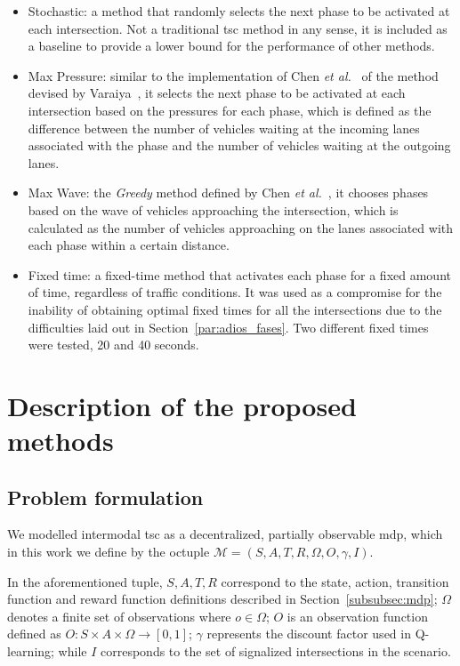 \begin{itemize}
    \item Stochastic: a method that randomly selects the next phase to be activated at each intersection. Not a traditional \gls{tsc} method in any sense, it is included as a baseline to provide a lower bound for the performance of other methods.
    \item Max Pressure: similar to the implementation of Chen \textit{et al.}~\cite{Chen2020} of the method devised by Varaiya~\cite{Varaiya2013}, it selects the next phase to be activated at each intersection based on the pressures for each phase, which is defined as the difference between the number of vehicles waiting at the incoming lanes associated with the phase and the number of vehicles waiting at the outgoing lanes.
    \item Max Wave: the \textit{Greedy} method defined by Chen \textit{et al.}~\cite{Chen2020}, it chooses phases based on the wave of vehicles approaching the intersection, which is calculated as the number of vehicles approaching on the lanes associated with each phase within a certain distance.
    \item Fixed time: a fixed-time method that activates each phase for a fixed amount of time, regardless of traffic conditions. It was used as a compromise for the inability of obtaining optimal fixed times for all the intersections due to the difficulties laid out in Section~\ref{par:adios_fases}. Two different fixed times were tested, 20 and 40 seconds.
\end{itemize}

\section{Description of the proposed methods} \label{sec:proposed_models}
\subsection{Problem formulation} \label{subsec:meth_problem_form}
We modelled intermodal \acrfull{tsc} as a decentralized, partially
observable \acrfull{mdp}, which in this work we define by the octuple $\mathcal{M}=(S,A,T,R,\Omega,O,\gamma,I)$.

In the aforementioned tuple, $S,A,T,R$ correspond to the state, action, transition function and reward function definitions described in Section~\ref{subsubsec:mdp}; $\Omega$ denotes a finite set of observations where $o \in \Omega$; $O$ is an observation function defined as $O:S\times A \times \Omega \rightarrow [0,1]$; $\gamma$ represents the discount factor used in Q-learning; while $I$ corresponds to the set of signalized intersections in the scenario.

